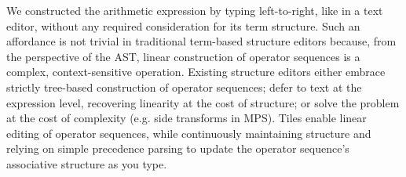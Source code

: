 

We constructed the arithmetic expression 
by typing left-to-right, like in a text editor, without any
required consideration for its term structure.
Such an affordance is not trivial
in traditional term-based structure editors because,
from the perspective of the AST, linear construction of
operator sequences is a complex, context-sensitive operation.
Existing structure editors either embrace strictly tree-based
construction of operator sequences;
defer to text at the expression level,
recovering linearity at the cost of structure;
or solve the problem at the cost of complexity
(e.g. side transforms in MPS).
Tiles enable linear editing of operator sequences,
while continuously maintaining structure and
relying on simple precedence parsing
to update the operator sequence's associative structure
as you type.








